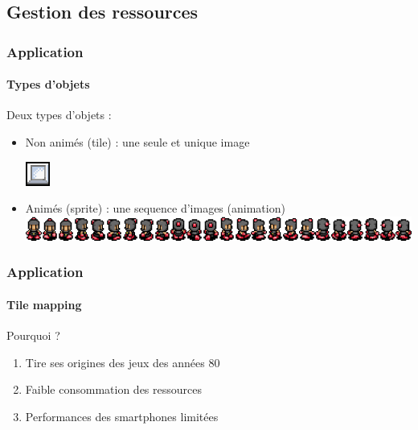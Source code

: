 	
%	
	
\subsection{Gestion des ressources}
	
	\begin{frame}
		\frametitle{Application}
		\framesubtitle{Types d'objets}
			Deux types d'objets :
			
			\begin{itemize}
				\item Non animés (tile) : une seule et unique image
					\begin{center}
						\includegraphics[scale=0.75]{img/bloc.png}
					\end{center}
									
				\item Animés (sprite) : une sequence d'images (animation)
					\includegraphics[scale=0.40]{img/player.png}
			\end{itemize}
	\end{frame}
	
	
	\begin{frame}
	\frametitle{Application}
	\framesubtitle{Tile mapping}

	Pourquoi ?

	\begin{enumerate}
		\item Tire ses origines des jeux des années 80
		\item Faible consommation des ressources 
		\item Performances des smartphones limitées
	\end{enumerate}
	\end{frame}

